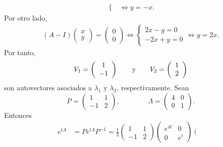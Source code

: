 \documentclass[11pt]{report}
\begin{document}
\begin{solution}
\begin{enumerate}
\begin{align*}
\begin{cases}
            \end{cases} \iff y = -x.
        \end{align*}
        Por otro lado,
        \begin{align*}
            (A-I)\left(\begin{array}{c}
                x \\
                y
            \end{array}\right) = \left(\begin{array}{c}
                0 \\
                0
            \end{array}\right) \iff \begin{cases}
                2x-y = 0 \\
                -2x+y = 0
            \end{cases} \iff y = 2x.
        \end{align*}
        Por tanto,
        \[V_1 = \left(\begin{array}{c}
            1 \\
            -1
        \end{array}\right) \qquad \textup{y} \qquad V_2 = \left(\begin{array}{c}
            1 \\
            2
        \end{array}\right)\]
        son autovectores asociados a $\lambda_1$ y $\lambda_2$, respectivamente. Sean
        \[P = \left(\begin{array}{cc}
            1 & 1 \\
            -1 & 2
        \end{array}\right), \qquad \qquad \Lambda = \left(\begin{array}{cc}
            4 & 0 \\
            0 & 1
        \end{array}\right).\]
        Entonces
        \begin{align*}
        e^{tA} &= Pe^{t\Lambda}P^{-1} = \frac{1}{3}\left(\begin{array}{cc}
            1 & 1 \\
            -1 & 2
        \end{array}\right)\left(\begin{array}{cc}
            e^{4t} & 0 \\
            0 & e^{t}
        \end{array}\right)\left(\begin{array}{cc}

\end{array}
\end{align*}
\end{enumerate}
\end{solution}
\end{document}
